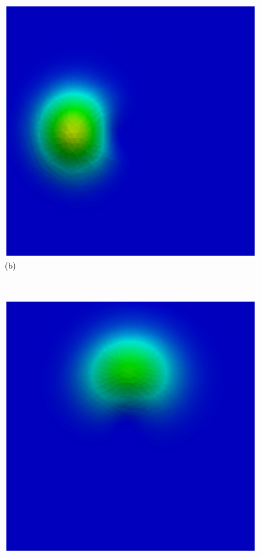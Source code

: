 \begin{figure}[H]
\begin{minipage}{.5\linewidth}
      \includegraphics[scale=0.42]{./02_chaps/cap_validation/figure/figSLlinear1.png}\\
      (b)
     \end{minipage}\\[10pt]
     \begin{minipage}{.5\linewidth}
      \centering
      \includegraphics[scale=0.42]{./02_chaps/cap_validation/figure/figSLlinear2.png}\\

\end{minipage}
\end{figure}
